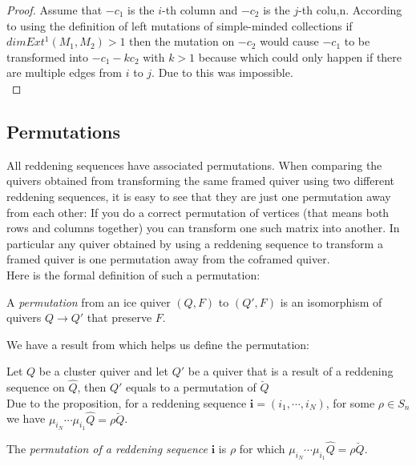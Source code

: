\begin{proof}
Assume that $-c_1$ is the $i$-th column and $-c_2$ is the $j$-th colu,n. According to \cite{KY12} using the definition of left mutations of simple-minded collections if $dim Ext^1(M_1, M_2) > 1$ then the mutation on $-c_2$ would cause $-c_1$ to be transformed into $-c_1-kc_2$ with $k>1$ because which could only happen if there are multiple edges from $i$ to $j$. Due to \cite{BHIT15} this was impossible.\\
\end{proof}
\subsection{Permutations}
\indent All reddening sequences have associated permutations. When comparing the quivers obtained from transforming the same framed quiver using two different reddening sequences, it is easy to see that they are just one permutation away from each other: If you do a correct permutation of vertices (that means both rows and columns together) you can transform one such matrix into another. In particular any quiver obtained by using a reddening sequence to transform a framed quiver is one permutation away from the coframed quiver.\\
\indent Here is the formal definition of such a permutation:\\
\begin{definition}
A \textit{permutation} from an ice quiver $(Q,F)$ to $(Q',F)$ is an isomorphism of quivers $Q\rightarrow Q'$ that preserve $F$.\cite{BDP13}\\
\end{definition}
\indent We have a result from \cite{BDP13} which helps us define the permutation:\\
\begin{theorem}
Let $Q$ be a cluster quiver and let $Q'$ be a quiver that is a result of a reddening sequence on $\hat{Q}$, then  $Q'$ equals to a permutation of $\breve{Q}$\cite{BDP13}\\
Due to the proposition, for a reddening sequence $\mathbf{i}=(i_1,\cdots, i_N)$, for some $\rho\in S_n$ we have $\mu_{i_N}\cdots\mu_{i_1}\hat{Q}=\rho\breve{Q}$.\\
\end{theorem}
\begin{definition}
The \textit{permutation of a reddening sequence} $\mathbf{i}$ is $\rho$ for which $\mu_{i_N}\cdots\mu_{i_1}\hat{Q}=\rho\breve{Q}$.\cite{GM14}\\
\end{definition}
